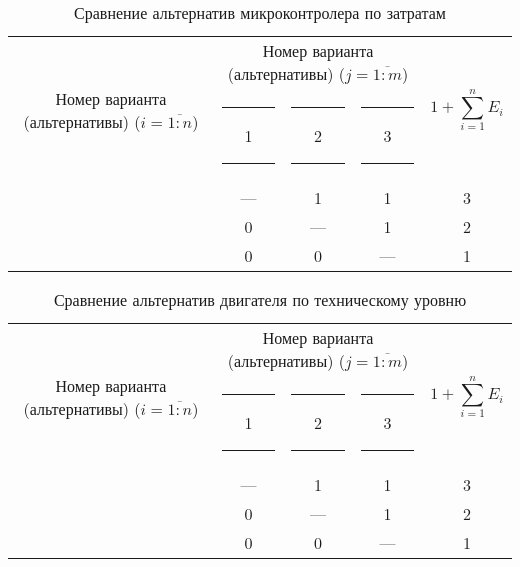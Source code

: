 \begin{table}[H]
    \centering
    \begin{tabular}{|c|c|c|c|c|}
        \hline
        \multirow{2}{2.4cm}[-0.5pc]{
            \centering
            Номер варианта (альтернативы) ($i = \overline{1:n}$)
        } &
        \multicolumn{3}{c|}{
            \parbox[t]{2.4cm}{
                \centering
                Номер варианта (альтернативы) ($j = \overline{1:m}$)
            }
        } &
        \multirow{2}{1.7cm}{
            \centering
            $$1 + \sum_{i=1}^n E_i$$
        } \\
        &
        \centering \rule{2pt}{0pt} 1 \rule{2pt}{0pt} &
        \centering \rule{2pt}{0pt} 2 \rule{2pt}{0pt} &
        \centering \rule{2pt}{0pt} 3 \rule{2pt}{0pt} & \\
        \hline \hline
        \centering{1} &---& 1 & 1 & 3 \\ \hline
        \centering{2} & 0 &---& 1 & 2 \\ \hline
        \centering{3} & 0 & 0 &---& 1 \\ \hline
    \end{tabular}
    \caption{Сравнение альтернатив микроконтролера по затратам}
    \label{tbl_mcu_cost_lvl_comparison}
\end{table}

\begin{table}[H]
    \centering
    \begin{tabular}{|c|c|c|c|c|}
        \hline
        \multirow{2}{2.4cm}[-0.5pc]{
            \centering
            Номер варианта (альтернативы) ($i = \overline{1:n}$)
        } &
        \multicolumn{3}{c|}{
            \parbox[t]{2.4cm}{
                \centering
                Номер варианта (альтернативы) ($j = \overline{1:m}$)
            }
        } &
        \multirow{2}{1.7cm}{
            \centering
            $$1 + \sum_{i=1}^n E_i$$
        } \\
        &
        \centering \rule{2pt}{0pt} 1 \rule{2pt}{0pt} &
        \centering \rule{2pt}{0pt} 2 \rule{2pt}{0pt} &
        \centering \rule{2pt}{0pt} 3 \rule{2pt}{0pt} & \\
        \hline \hline
        \centering{1} &---& 1 & 1 & 3 \\ \hline
        \centering{2} & 0 &---& 1 & 2 \\ \hline
        \centering{3} & 0 & 0 &---& 1 \\ \hline
    \end{tabular}
    \caption{Сравнение альтернатив двигателя по техническому уровню}
    \label{tbl_motor_tech_lvl_comparison}
\end{table}

